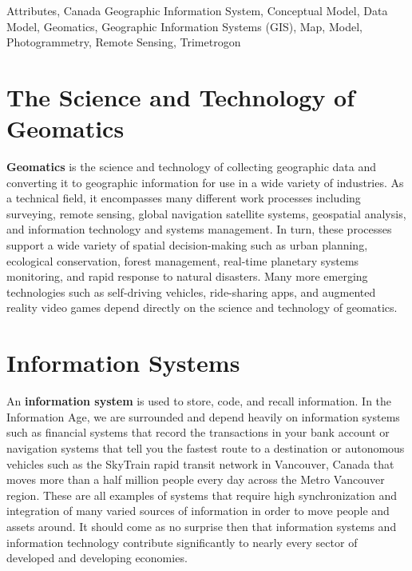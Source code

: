 \documentclass[
]{book}
\begin{document}
Attributes, Canada Geographic Information System, Conceptual Model, Data Model, Geomatics, Geographic Information Systems (GIS), Map, Model, Photogrammetry, Remote Sensing, Trimetrogon

\section{The Science and Technology of Geomatics}\label{the-science-and-technology-of-geomatics}

\textbf{Geomatics} is the science and technology of collecting geographic data and converting it to geographic information for use in a wide variety of industries. As a technical field, it encompasses many different work processes including surveying, remote sensing, global navigation satellite systems, geospatial analysis, and information technology and systems management. In turn, these processes support a wide variety of spatial decision-making such as urban planning, ecological conservation, forest management, real-time planetary systems monitoring, and rapid response to natural disasters. Many more emerging technologies such as self-driving vehicles, ride-sharing apps, and augmented reality video games depend directly on the science and technology of geomatics.

\section{Information Systems}\label{information-systems}

An \textbf{information system} is used to store, code, and recall information. In the Information Age, we are surrounded and depend heavily on information systems such as financial systems that record the transactions in your bank account or navigation systems that tell you the fastest route to a destination or autonomous vehicles such as the SkyTrain rapid transit network in Vancouver, Canada that moves more than a half million people every day across the Metro Vancouver region. These are all examples of systems that require high synchronization and integration of many varied sources of information in order to move people and assets around. It should come as no surprise then that information systems and information technology contribute significantly to nearly every sector of developed and developing economies.
\end{document}
